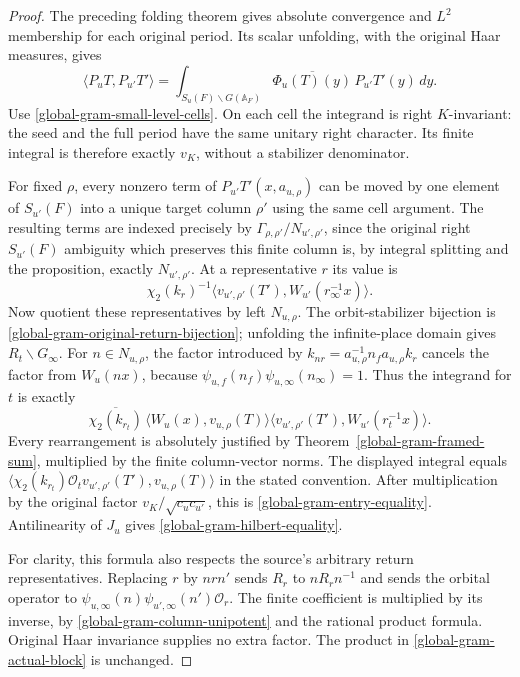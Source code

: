 \begin{proof}
The preceding folding theorem gives absolute convergence and
$L^2$ membership for each original period.  Its scalar unfolding,
with the original Haar measures, gives
\[
 \langle P_uT,P_{u'}T'\rangle
  =\int_{S_u(F)\backslash G(\mathbb A_F)}
       \overline{\Phi_u(T)(y)}\,P_{u'}T'(y)\,dy.
\]
Use \eqref{global-gram-small-level-cells}.  On each cell the
integrand is right $K$-invariant: the seed and the full period
have the same unitary right character.  Its finite integral is
therefore exactly $v_K$, without a stabilizer denominator.

For fixed $\rho$, every nonzero term of
$P_{u'}T'(x,a_{u,\rho})$ can be moved by one element of
$S_{u'}(F)$ into a unique target column $\rho'$ using the same
cell argument.  The resulting terms are indexed precisely by
$\Gamma_{\rho,\rho'}/N_{u',\rho'}$, since the original right
$S_{u'}(F)$ ambiguity which preserves this finite column is,
by integral splitting and the proposition, exactly
$N_{u',\rho'}$.  At a representative $r$ its value is
\[
 \chi_2(k_r)^{-1}
    \langle v_{u',\rho'}(T'),W_{u'}(r_\infty^{-1}x)\rangle.
\]
Now quotient these representatives by left $N_{u,\rho}$.  The
orbit-stabilizer bijection is
\eqref{global-gram-original-return-bijection}; unfolding the
infinite-place domain gives $R_t\backslash G_\infty$.
For $n\in N_{u,\rho}$, the factor introduced by
$k_{nr}=a_{u,\rho}^{-1}n_fa_{u,\rho}k_r$ cancels the factor
from $W_u(nx)$, because
$\psi_{u,f}(n_f)\psi_{u,\infty}(n_\infty)=1$.
Thus the integrand for $t$ is exactly
\[
 \overline{\chi_2(k_{r_t})}\,
 \langle W_u(x),v_{u,\rho}(T)\rangle
 \langle v_{u',\rho'}(T'),W_{u'}(r_t^{-1}x)\rangle.
\]
Every rearrangement is absolutely justified by
Theorem~\ref{global-gram-framed-sum}, multiplied by the finite
column-vector norms.  The displayed integral equals
$\langle\chi_2(k_{r_t})\mathcal O_t
v_{u',\rho'}(T'),v_{u,\rho}(T)\rangle$ in the stated convention.
After multiplication by the original factor
$v_K/\sqrt{c_uc_{u'}}$, this is
\eqref{global-gram-entry-equality}.  Antilinearity of $J_u$
gives \eqref{global-gram-hilbert-equality}.

For clarity, this formula also respects the source's arbitrary
return representatives.  Replacing $r$ by $nrn'$ sends
$R_r$ to $nR_rn^{-1}$ and sends the orbital operator to
$\psi_{u,\infty}(n)\psi_{u',\infty}(n')\mathcal O_r$.
The finite coefficient is multiplied by its inverse, by
\eqref{global-gram-column-unipotent} and the rational product
formula.  Original Haar invariance supplies no extra factor.
The product in \eqref{global-gram-actual-block} is unchanged.
\end{proof}

